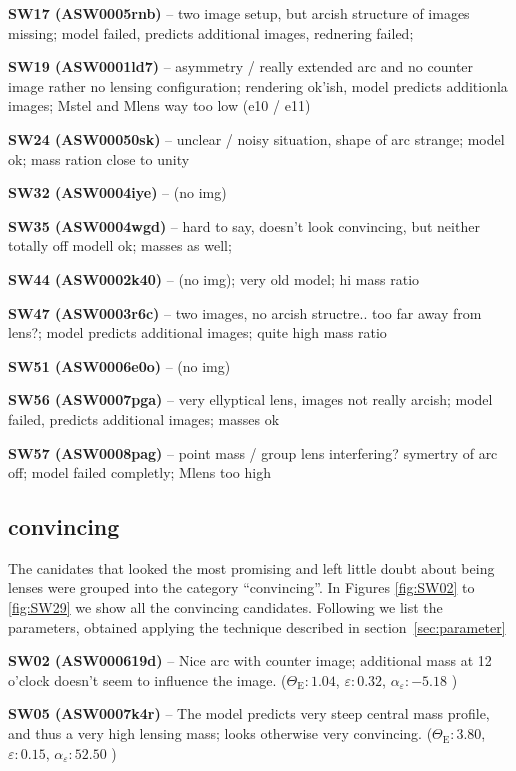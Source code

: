 \documentclass[fleqn,usenatbib]{mnras}
\newcommand{\lenstitle}[1]{\noindent\textbf{#1} --}
\newcommand{\params}[3]{(\(\Theta_\text{E}:#1\), $\varepsilon:#2$, $\alpha_\varepsilon:#3$ )}
\begin{document}
\lenstitle{SW17 (ASW0005rnb)} 
  two image setup, but arcish structure of images missing;
  model failed, predicts additional images, rednering failed;
  
\lenstitle{SW19 (ASW0001ld7)} 
  asymmetry / really extended arc and no counter image rather no lensing configuration;
  rendering ok'ish, model predicts additionla images;
  Mstel and Mlens way too low (e10 / e11)
  
\lenstitle{SW24 (ASW00050sk)} 
  unclear / noisy situation, shape of arc strange;
  model ok;
  mass ration close to unity
  
\lenstitle{SW32 (ASW0004iye)} 
  (no img)
  
\lenstitle{SW35 (ASW0004wgd)} 
  hard to say, doesn't look convincing, but neither totally off
  modell ok;
  masses as well;
  
\lenstitle{SW44 (ASW0002k40)} 
  (no img);
  very old model;
  hi mass ratio
  
\lenstitle{SW47 (ASW0003r6c)} 
  two images, no arcish structre.. too far away from lens?;
  model predicts additional images;
  quite high mass ratio
  
\lenstitle{SW51 (ASW0006e0o)} 
  (no img)
  
\lenstitle{SW56 (ASW0007pga)} 
  very ellyptical lens, images not really arcish;
  model failed, predicts additional images;
  masses ok
  
\lenstitle{SW57 (ASW0008pag)} 
  point mass / group lens interfering? symertry of arc off;
  model failed completly;
  Mlens too high
  


\subsection{convincing}

The canidates that looked the most promising and left little doubt about being lenses were grouped into the category ``convincing''.
In Figures \ref{fig:SW02} to \ref{fig:SW29} we show all the convincing candidates.
Following we list the parameters, obtained applying the technique described in section~\ref{sec:parameter}

\lenstitle{SW02 (ASW000619d)}
Nice arc with counter image;
additional mass at 12 o'clock doesn't seem to influence the image.
\params{1.04}{0.32}{-5.18}

\lenstitle{SW05 (ASW0007k4r)}
The model predicts very steep central mass profile, and thus a very high lensing mass;
looks otherwise very convincing.
\params{3.80}{0.15}{52.50}
  
\end{document}
